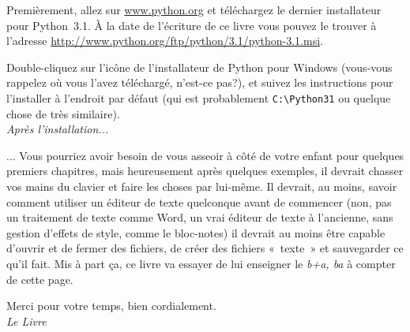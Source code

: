 Premièrement, allez sur \url{www.python.org} et téléchargez le dernier installateur pour Python 3.1. À la date de l'écriture de ce livre vous pouvez le trouver à l'adresse  \url{http://www.python.org/ftp/python/3.1/python-3.1.msi}.

Double-cliquez sur l'icône de l'installateur de Python pour Windows (vous-vous rappelez où vous l'avez téléchargé, n'est-ce pas?), et suivez les instructions pour l'installer à l'endroit par défaut (qui est probablement \verb+C:\Python31+ ou quelque chose de très similaire).\\


\textit{Après l'installation...}


... Vous pourriez avoir besoin de vous asseoir à côté de votre enfant pour quelques premiers chapitres, mais 
heureusement après quelques exemples, il devrait chasser vos mains du clavier et faire les choses par lui-même. 
Il devrait, au moins, savoir comment utiliser un éditeur de texte quelconque avant de commencer (non, pas un traitement de texte comme Word, un vrai éditeur de texte à l'ancienne, sans gestion d'effets de style, comme le bloc-notes) il devrait au moins être capable d'ouvrir et de fermer des fichiers, de créer des fichiers « texte » et sauvegarder ce qu'il fait. Mis à part ça, ce livre va essayer de lui enseigner le \textit{b+a, ba} à compter de cette page.

\bigskip
Merci pour votre temps, bien cordialement.\\


\textit{Le Livre}
